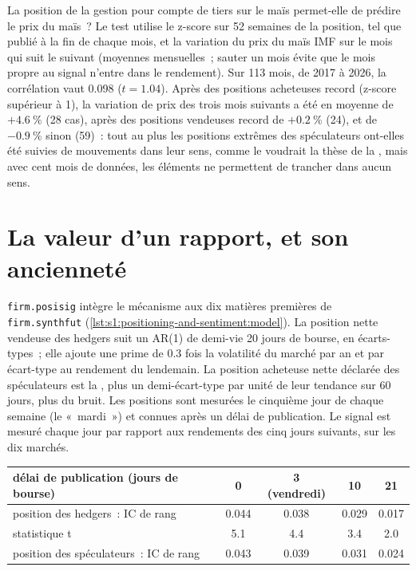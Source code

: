 La position de la gestion pour compte de tiers sur le maïs permet-elle de prédire le prix du maïs~? Le test utilise le z-score sur 52 semaines de la position, tel que publié à la fin de chaque mois, et la variation du prix du maïs IMF
sur le mois qui suit le suivant (moyennes mensuelles~; sauter un mois évite que le mois propre au signal n'entre dans le rendement). Sur 113 mois,
de 2017 à 2026, la corrélation vaut 0.098 ($t = 1.04$). Après des positions acheteuses record (z-score supérieur à 1), la variation de prix des trois mois suivants a été en moyenne
de $+4.6~\%$ (28 cas), après des positions vendeuses record de $+0.2~\%$ (24), et de $-0.9~\%$ sinon (59)~: tout au plus les positions extrêmes des spéculateurs ont-elles été suivies de mouvements
dans leur sens, comme le voudrait la thèse de la , mais avec cent mois de données, les éléments ne permettent de trancher dans aucun sens.

\section{La valeur d'un rapport, et son ancienneté}

\texttt{firm.posisig} intègre le mécanisme aux dix matières premières de \texttt{firm.synthfut} (\cref{lst:s1:positioning-and-sentiment:model}). La position nette
vendeuse des hedgers suit un AR(1) de demi-vie 20 jours de bourse, en écarts-types~; elle ajoute une prime de 0.3 fois la volatilité du marché par an et par écart-type
au rendement du lendemain. La position acheteuse nette déclarée des spéculateurs est la , plus un demi-écart-type par unité de leur tendance sur 60 jours,
plus du bruit. Les positions sont mesurées le cinquième jour de chaque semaine (le «~mardi~») et connues après un délai de publication.
Le signal est mesuré chaque jour par rapport aux rendements des cinq jours suivants, sur les dix marchés.

\begin{center}
\small
\begin{tabular}{@{}lcccc@{}}
\toprule
délai de publication (jours de bourse) & 0 & 3 (vendredi) & 10 & 21\\
\midrule
position des hedgers~: IC de rang & 0.044 & 0.038 & 0.029 & 0.017\\
\quad statistique t & 5.1 & 4.4 & 3.4 & 2.0\\
position des spéculateurs~: IC de rang & 0.043 & 0.039 & 0.031 & 0.024\\
\bottomrule
\end{tabular}
\end{center}

